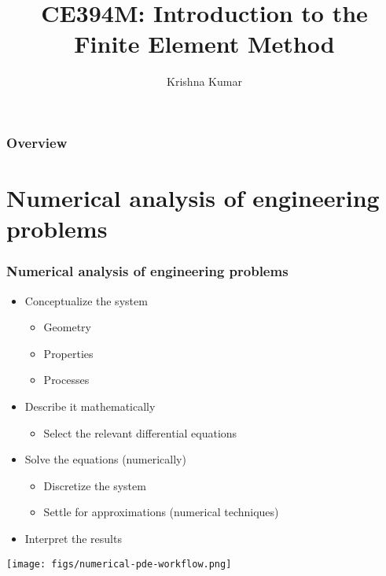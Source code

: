 \documentclass[notes]{beamer}
\title[CE394M: Intro to FEM]{CE394M: Introduction to the Finite Element Method}
\author{Krishna Kumar} %
\institute[UT Austin] %
{
University of Texas at Austin \\
\medskip
\textit{
  \url{krishnak@utexas.edu}} %
}
\date{} %
\begin{document}
\begin{frame}
\titlepage %
\end{frame}

\begin{frame}
 \frametitle{Overview}
 \tableofcontents
\end{frame}

\section{Numerical analysis of engineering problems}
\begin{frame}
\frametitle{Numerical analysis of engineering problems}
	\begin{itemize}
		\item Conceptualize the system
		\begin{itemize}
			\item Geometry
			\item Properties
			\item Processes
		\end{itemize}
		\item Describe it mathematically
		\begin{itemize}
			\item Select the relevant differential equations
		\end{itemize}
		\item Solve the equations (numerically)
		\begin{itemize}
			\item Discretize the system
			\item Settle for approximations (numerical techniques)
		\end{itemize}
		\item Interpret the results
	\end{itemize}
\texttt{[image: figs/numerical-pde-workflow.png]}
\end{frame}
\end{document}
